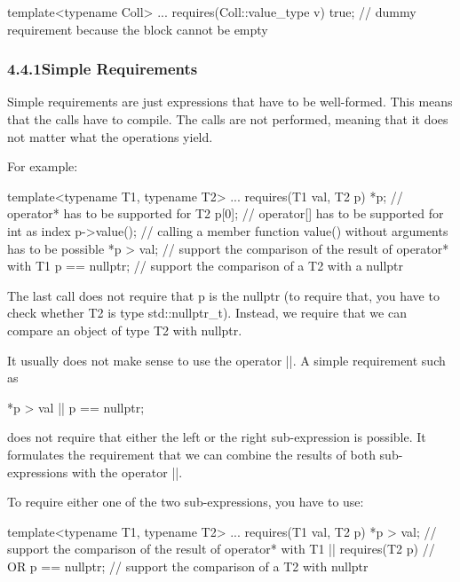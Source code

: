 \begin{cpp}
template<typename Coll>
... requires(Coll::value_type v) {
		true; // dummy requirement because the block cannot be empty
	}
\end{cpp}

\subsubsection*{ 4.4.1\hspace{0.2cm}Simple Requirements}

Simple requirements are just expressions that have to be well-formed. This means that the calls have to compile. The calls are not performed, meaning that it does not matter what the operations yield.

For example:

\begin{cpp}
template<typename T1, typename T2>
... requires(T1 val, T2 p) {
		*p; // operator* has to be supported for T2
		p[0]; // operator[] has to be supported for int as index
		p->value(); // calling a member function value() without arguments has to be possible
		*p > val; // support the comparison of the result of operator* with T1
		p == nullptr; // support the comparison of a T2 with a nullptr
	}
\end{cpp}

The last call does not require that p is the nullptr (to require that, you have to check whether T2 is type std::nullptr\_t). Instead, we require that we can compare an object of type T2 with nullptr.

It usually does not make sense to use the operator ||. A simple requirement such as

\begin{cpp}
*p > val || p == nullptr;
\end{cpp}

does not require that either the left or the right sub-expression is possible. It formulates the requirement that we can combine the results of both sub-expressions with the operator ||.

To require either one of the two sub-expressions, you have to use:

\begin{cpp}
template<typename T1, typename T2>
... requires(T1 val, T2 p) {
		*p > val; // support the comparison of the result of operator* with T1
	}
	|| requires(T2 p) { // OR
		p == nullptr; // support the comparison of a T2 with nullptr
	}
\end{cpp}

